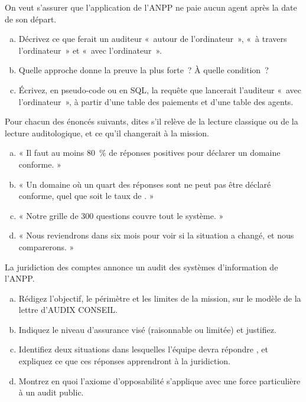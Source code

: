 \begin{boxexo}[title={\ding{45}\quad Exercice~1.7. Approches de l'audit informatique \niveaumoyen}]
On veut s'assurer que l'application de l'ANPP ne paie aucun agent après la
date de son départ.
\begin{enumerate}[(a)]
    \item Décrivez ce que ferait un auditeur «~autour de l'ordinateur~»,
          «~à travers l'ordinateur~» et «~avec l'ordinateur~».
    \item Quelle approche donne la preuve la plus forte~? À quelle
          condition~?
    \item Écrivez, en pseudo-code ou en SQL, la requête que lancerait
          l'auditeur «~avec l'ordinateur~», à partir d'une table des paiements
          et d'une table des agents.
\end{enumerate}
\end{boxexo}

\begin{boxexo}[title={\ding{45}\quad Exercice~1.8. Deux lectures de l'audit \niveaumoyen}]
Pour chacun des énoncés suivants, dites s'il relève de la lecture
classique ou de la lecture auditologique, et ce qu'il changerait à la
mission.
\begin{enumerate}[(a)]
    \item « Il faut au moins 80~\% de réponses positives pour déclarer un
          domaine conforme. »
    \item « Un domaine où un quart des réponses sont \NEK{} ne peut pas être
          déclaré conforme, quel que soit le taux de \OUI{}. »
    \item « Notre grille de 300 questions couvre tout le système. »
    \item « Nous reviendrons dans six mois pour voir si la situation a
          changé, et nous comparerons. »
\end{enumerate}
\end{boxexo}

\begin{boxexo}[title={\ding{45}\quad Exercice~1.9. Une lettre de mission publique \niveauexpert}]
La juridiction des comptes annonce un audit des systèmes d'information de
l'ANPP.
\begin{enumerate}[(a)]
    \item Rédigez l'objectif, le périmètre et les limites de la mission, sur
          le modèle de la lettre d'AUDIX CONSEIL.
    \item Indiquez le niveau d'assurance visé (raisonnable ou limitée) et
          justifiez.
    \item Identifiez deux situations dans lesquelles l'équipe devra répondre
          \NEK{}, et expliquez ce que ces réponses apprendront à la
          juridiction.
    \item Montrez en quoi l'axiome d'opposabilité s'applique avec une force
          particulière à un audit public.
\end{enumerate}
\end{boxexo}

